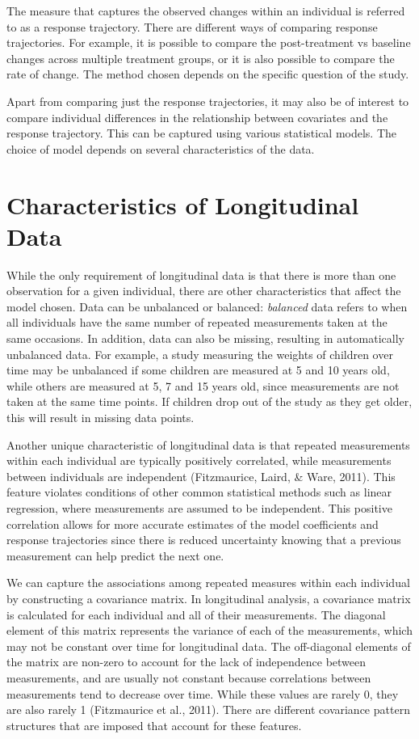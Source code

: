 \documentclass[12pt, twoside]{amherstthesis}
\begin{document}
The measure that captures the observed changes within an individual is referred to as a response trajectory. There are different ways of comparing response trajectories. For example, it is possible to compare the post-treatment vs baseline changes across multiple treatment groups, or it is also possible to compare the rate of change. The method chosen depends on the specific question of the study.

Apart from comparing just the response trajectories, it may also be of interest to compare individual differences in the relationship between covariates and the response trajectory. This can be captured using various statistical models. The choice of model depends on several characteristics of the data.

\hypertarget{characteristics-of-longitudinal-data}{%
\section{Characteristics of Longitudinal Data}\label{characteristics-of-longitudinal-data}}

While the only requirement of longitudinal data is that there is more than one observation for a given individual, there are other characteristics that affect the model chosen. Data can be unbalanced or balanced: \emph{balanced} data refers to when all individuals have the same number of repeated measurements taken at the same occasions. In addition, data can also be missing, resulting in automatically unbalanced data. For example, a study measuring the weights of children over time may be unbalanced if some children are measured at 5 and 10 years old, while others are measured at 5, 7 and 15 years old, since measurements are not taken at the same time points. If children drop out of the study as they get older, this will result in missing data points.

Another unique characteristic of longitudinal data is that repeated measurements within each individual are typically positively correlated, while measurements between individuals are independent (Fitzmaurice, Laird, \& Ware, 2011). This feature violates conditions of other common statistical methods such as linear regression, where measurements are assumed to be independent. This positive correlation allows for more accurate estimates of the model coefficients and response trajectories since there is reduced uncertainty knowing that a previous measurement can help predict the next one.

We can capture the associations among repeated measures within each individual by constructing a covariance matrix. In longitudinal analysis, a covariance matrix is calculated for each individual and all of their measurements. The diagonal element of this matrix represents the variance of each of the measurements, which may not be constant over time for longitudinal data. The off-diagonal elements of the matrix are non-zero to account for the lack of independence between measurements, and are usually not constant because correlations between measurements tend to decrease over time. While these values are rarely 0, they are also rarely 1 (Fitzmaurice et al., 2011). There are different covariance pattern structures that are imposed that account for these features.
\end{document}
